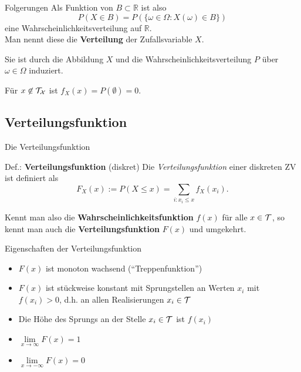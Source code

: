 \documentclass[
  10pt,
  ignorenonframetext,
]{beamer}
\providecommand{\tightlist}{%
  \setlength{\itemsep}{0pt}\setlength{\parskip}{0pt}}
\begin{document}
\begin{frame}{Folgerungen}
\label{folgerungen-1}
Als Funktion von \(B \subset \mathbb{R}\) ist also
\[P(X \in B) = P(\{\omega \in \Omega: X(\omega) \in B\})\] eine
Wahrscheinlichkeitsverteilung auf \(\mathbb{R}\).\\
Man nennt diese die \textbf{Verteilung} der Zufallsvariable \(X\).

Sie ist durch die Abbildung \(X\) und die Wahrscheinlichkeitsverteilung
\(P\) über \(\omega \in \Omega\) induziert. ~ ~

Für \(x \not \in {\cal{T}_X}\) ist \(f_X(x) = P(\emptyset) = 0\).
\end{frame}

\subsection{Verteilungsfunktion}\label{verteilungsfunktion}

\begin{frame}{Die Verteilungsfunktion}
\label{die-verteilungsfunktion}
\begin{block}{Def.: \textbf{Verteilungsfunktion} (diskret)}
\label{def.-verteilungsfunktion-diskret}
Die \emph{Verteilungsfunktion} einer diskreten ZV ist definiert als
\[F_X(x) := P(X \leq x) = \sum_{i: x_i \leq x} f_X(x_i).\]
\end{block}

Kennt man also die \textbf{Wahrscheinlichkeitsfunktion} \(f(x)\) für
alle \(x \in \cal{T}\), so kennt man auch die
\textbf{Verteilungsfunktion} \(F(x)\) und umgekehrt.

\end{frame}

\begin{frame}{Eigenschaften der Verteilungsfunktion}
\label{eigenschaften-der-verteilungsfunktion}
\begin{itemize}
\tightlist
\item
  \(F(x)\) ist monoton wachsend (``Treppenfunktion'')\\
\item
  \(F(x)\) ist stückweise konstant mit Sprungstellen an Werten \(x_i\)
  mit \(f(x_i) > 0\), d.h. an allen Realisierungen \(x_i \in {\cal{T}}\)
\item
  Die Höhe des Sprungs an der Stelle \(x_i \in {\cal{T}}\) ist
  \(f(x_i)\)
\item
  \(\lim\limits_{x \to \infty} F(x) = 1\)
\item
  \(\lim\limits_{x \to -\infty} F(x) = 0\)
\end{itemize}
\end{frame}
\end{document}
